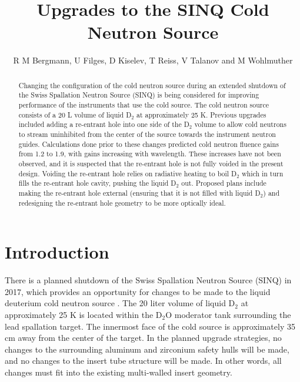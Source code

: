 \documentclass[a4paper]{jpconf}
\begin{document}
\title{Upgrades to the SINQ Cold Neutron Source}

\author{R M Bergmann, U Filges, D Kiselev, T Reiss, V Talanov and M Wohlmuther}

\address{Paul Scherrer Institut, 5232 Villigen, Switzerland}


\begin{abstract}Changing the configuration of the cold neutron source during an extended shutdown of the Swiss Spallation Neutron Source (SINQ) is being considered for improving performance of the instruments that use the cold source.  The cold neutron source consists of a 20 L volume of liquid D$_2$ at approximately 25 K.  Previous upgrades included adding a re-entrant hole into one side of the D$_2$ volume to allow cold neutrons to stream uninhibited from the center of the source towards the instrument neutron guides.  Calculations done prior to these changes predicted cold neutron fluence gains from 1.2 to 1.9, with gains increasing with wavelength. These increases have not been observed, and it is suspected that the re-entrant hole is not fully voided in the present design.  Voiding the re-entrant hole relies on radiative heating to boil D$_2$ which in turn fills the re-entrant hole cavity, pushing the liquid D$_2$ out.  Proposed plans include making the re-entrant hole external (ensuring that it is not filled with liquid D$_2$) and redesigning the re-entrant hole geometry to be more optically ideal.  
\end{abstract}


\section{Introduction}

There is a planned shutdown of the Swiss Spallation Neutron Source (SINQ) in 2017, which provides an opportunity for changes to be made to the liquid deuterium cold neutron source \cite{rueegg_icans}.  The 20 liter volume of liquid D$_2$ at approximately 25 K is located within the D$_2$O moderator tank surrounding the lead spallation target.  The innermost face of the cold source is approximately 35 cm away from the center of the target.  In the planned upgrade strategies, no changes to the surrounding aluminum and zirconium safety hulls will be made, and no changes to the insert tube structure will be made.  In other words, all changes must fit into the existing multi-walled insert geometry.  
\end{document}
